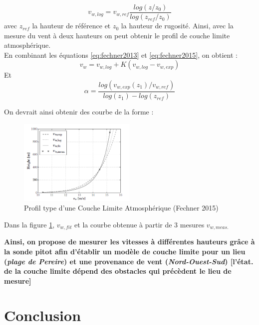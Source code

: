 \begin{equation}
    v_{w,log} = v_{w,ref} \frac{log(z/z_0)}{log(z_{ref}/z_0)}
    \label{eq:fechner2015}
\end{equation}
avec $z_{ref}$ la hauteur de référence et $z_0$ la hauteur de rugosité. Ainsi, avec la mesure du vent à deux hauteurs on peut obtenir le profil de couche limite atmosphérique.\\

En combinant les équations \ref{eq:fechner2013} et \ref{eq:fechner2015}, on obtient : 
\begin{equation}
    v_{w} = v_{w,log} + K (v_{w,log} - v_{w,exp})
\end{equation}
Et 
\begin{equation}
    \alpha = \frac{log(v_{w,exp}(z_1)/v_{w,ref})}{log(z_1)-log(z_{ref})}
\end{equation}

On devrait ainsi obtenir des courbe de la forme : 

\begin{figure}[H]
    \centering
    \includegraphics[width=0.5\textwidth]{Pics/02 - Mesure de l'angle d'incidence au Zénith/cl atmo.png}  
    \caption{Profil type d'une Couche Limite Atmosphérique (Fechner 2015)}
    \label{fig:cl atmo}
\end{figure}

Dans la figure \ref{fig:cl atmo}, $v_{w,fit}$ et la courbe obtenue à partir de 3 mesures $v_{w,meas.}$

\textbf{Ainsi, on propose de mesurer les vitesses à différentes hauteurs grâce à la sonde pitot afin d'établir un modèle de couche limite pour un lieu (\textit{plage de Pereire}) et une provenance de vent (\textit{Nord-Ouest-Sud}) [l'état. de la couche limite dépend des obstacles qui précèdent le lieu de mesure]}

\section{Conclusion} 
\label{sec:Ch2.5}


